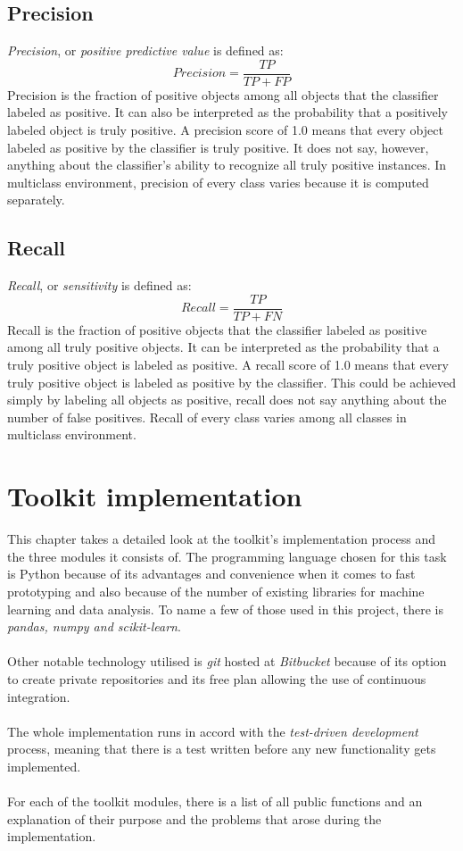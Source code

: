 \documentclass[11pt]{article}
\begin{document}
    \subsection{Precision}
      {\it Precision}, or {\it positive predictive value} is defined as:
      \begin{displaymath}
        Precision = \frac{TP}{TP + FP}
      \end{displaymath}
      Precision is the fraction of positive objects among all objects that the classifier labeled as positive. It can also be interpreted as the probability that a positively labeled object is truly positive. A precision score of 1.0 means that every object labeled as positive by the classifier is truly positive. It does not say, however, anything about the classifier's ability to recognize all truly positive instances. In multiclass environment, precision of every class varies because it is computed separately.
    \subsection{Recall}
      {\it Recall}, or {\it sensitivity} is defined as:
      \begin{displaymath}
        Recall = \frac{TP}{TP + FN}
      \end{displaymath}
      Recall is the fraction of positive objects that the classifier labeled as positive among all truly positive objects. It can be interpreted as the probability that a truly positive object is labeled as positive. A recall score of 1.0 means that every truly positive object is labeled as positive by the classifier. This could be achieved simply by labeling all objects as positive, recall does not say anything about the number of false positives. Recall of every class varies among all classes in multiclass environment.
  \newpage
  \section{Toolkit implementation}
      This chapter takes a detailed look at the toolkit's implementation process and the three modules it consists of. The programming language chosen for this task is Python\cite{python} because of its advantages and convenience when it comes to fast prototyping and also because of the number of existing libraries for machine learning and data analysis. To name a few of those used in this project, there is {\it pandas, numpy and scikit-learn}\cite{pandas, numpy, scikit}.
      \\~\\
      Other notable technology utilised is {\it git} hosted at {\it Bitbucket} because of its option to create private repositories and its free plan allowing the use of continuous integration\cite{bitbucket}.
      \\~\\
      The whole implementation runs in accord with the {\it test-driven development} process, meaning that there is a test written before any new functionality gets implemented.
      \\~\\
      For each of the toolkit modules, there is a list of all public functions and an explanation of their purpose and the problems that arose during the implementation.
\end{document}
